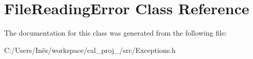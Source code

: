 \hypertarget{class_file_reading_error}{}\section{File\+Reading\+Error Class Reference}
\label{class_file_reading_error}


The documentation for this class was generated from the following file\+:\begin{DoxyCompactItemize}
\item 
C\+:/\+Users/\+Inês/workspace/cal\+\_\+proj\+\_/src/Exceptions.\+h\end{DoxyCompactItemize}
